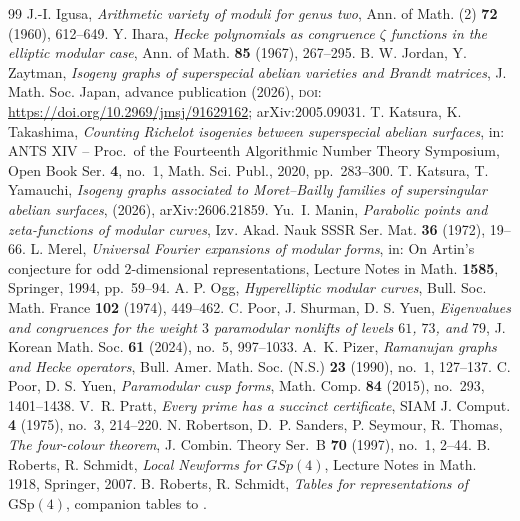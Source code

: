 \documentclass[10pt,a4paper]{amsart}
\providecommand{\doi}[1]{\textsc{doi:}\,\url{https://doi.org/#1}}
\begin{document}
\begin{thebibliography}{99}
 J.-I. Igusa, \emph{Arithmetic variety of moduli for genus two}, Ann. of Math. (2) \textbf{72} (1960), 612--649.
 Y. Ihara, \emph{Hecke polynomials as congruence $\zeta$ functions in the elliptic modular case}, Ann. of Math. \textbf{85} (1967), 267--295.
 B. W. Jordan, Y. Zaytman, \emph{Isogeny graphs of superspecial abelian varieties and Brandt matrices}, J. Math. Soc. Japan, advance publication (2026), \doi{10.2969/jmsj/91629162}; arXiv:2005.09031.
 T. Katsura, K. Takashima, \emph{Counting Richelot isogenies between superspecial abelian surfaces}, in: ANTS XIV -- Proc.\ of the Fourteenth Algorithmic Number Theory Symposium, Open Book Ser. \textbf{4}, no.~1, Math. Sci. Publ., 2020, pp.~283--300.
 T. Katsura, T. Yamauchi, \emph{Isogeny graphs associated to Moret--Bailly families of supersingular abelian surfaces}, (2026), arXiv:2606.21859.
 Yu.~I. Manin, \emph{Parabolic points and zeta-functions of modular curves}, Izv. Akad. Nauk SSSR Ser. Mat. \textbf{36} (1972), 19--66.
 L. Merel, \emph{Universal Fourier expansions of modular forms}, in: On Artin's conjecture for odd $2$-dimensional representations, Lecture Notes in Math. \textbf{1585}, Springer, 1994, pp.~59--94.
 A. P. Ogg, \emph{Hyperelliptic modular curves}, Bull. Soc. Math. France \textbf{102} (1974), 449--462.
 C. Poor, J. Shurman, D. S. Yuen, \emph{Eigenvalues and congruences for the weight $3$ paramodular nonlifts of levels $61$, $73$, and $79$}, J. Korean Math. Soc. \textbf{61} (2024), no.~5, 997--1033.
 A.~K. Pizer, \emph{Ramanujan graphs and Hecke operators}, Bull. Amer. Math. Soc. (N.S.) \textbf{23} (1990), no.~1, 127--137.
 C. Poor, D. S. Yuen, \emph{Paramodular cusp forms}, Math. Comp. \textbf{84} (2015), no.~293, 1401--1438.
 V.~R. Pratt, \emph{Every prime has a succinct certificate}, SIAM J. Comput. \textbf{4} (1975), no.~3, 214--220.
 N. Robertson, D.~P. Sanders, P. Seymour, R. Thomas, \emph{The four-colour theorem}, J. Combin. Theory Ser.~B \textbf{70} (1997), no.~1, 2--44.
 B. Roberts, R. Schmidt, \emph{Local Newforms for $GSp(4)$}, Lecture Notes in Math. 1918, Springer, 2007.
 B. Roberts, R. Schmidt, \emph{Tables for representations of $\mathrm{GSp}(4)$}, companion tables to \cite{RobertsSchmidt}.

\end{thebibliography}
\end{document}

